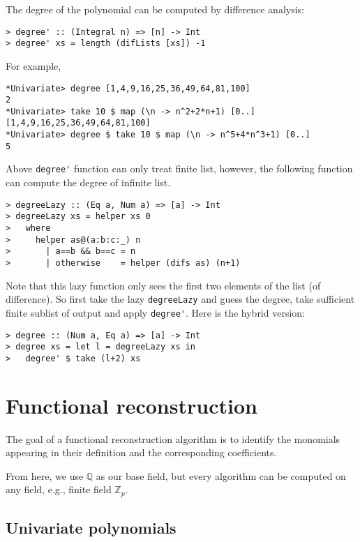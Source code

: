 \documentclass[11pt]{book}
\begin{document}
The degree of the polynomial can be computed by difference analysis:
\begin{verbatim}
> degree' :: (Integral n) => [n] -> Int
> degree' xs = length (difLists [xs]) -1
\end{verbatim}
For example,
\begin{verbatim}
*Univariate> degree [1,4,9,16,25,36,49,64,81,100]
2
*Univariate> take 10 $ map (\n -> n^2+2*n+1) [0..]
[1,4,9,16,25,36,49,64,81,100]
*Univariate> degree $ take 10 $ map (\n -> n^5+4*n^3+1) [0..]
5
\end{verbatim}

Above \verb+degree'+ function can only treat finite list, however, the following function can compute the degree of infinite list.
\begin{verbatim} 
> degreeLazy :: (Eq a, Num a) => [a] -> Int
> degreeLazy xs = helper xs 0
>   where
>     helper as@(a:b:c:_) n
>       | a==b && b==c = n
>       | otherwise    = helper (difs as) (n+1)
\end{verbatim}
Note that this lazy function only sees the first two elements of the list (of difference).
So first take the lazy \verb+degreeLazy+ and guess the degree, take sufficient finite sublist of output and apply \verb+degree'+.
Here is the hybrid version:
\begin{verbatim}
> degree :: (Num a, Eq a) => [a] -> Int
> degree xs = let l = degreeLazy xs in
>   degree' $ take (l+2) xs
\end{verbatim}


\chapter{Functional reconstruction}
The goal of a functional reconstruction algorithm is to identify the monomials appearing in their definition and the corresponding coefficients.

From here, we use $\mathbb{Q}$ as our base field, but every algorithm can be computed on any field, e.g., finite field $\mathbb{Z}_p$.

\section{Univariate polynomials}
\end{document}
